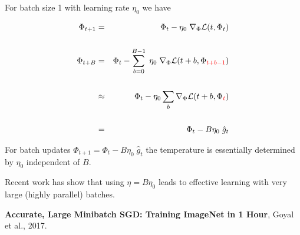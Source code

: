 {

For batch size 1 with learning rate $\eta_0$ we have

\begin{eqnarray*}
\Phi_{t+1} & = &  \Phi_{t} - \eta_0\;\nabla_\Phi {\cal L}(t,\Phi_{t}) \\
\\
\Phi_{t+B} & = &  \Phi_{t} - \sum_{b=0}^{B-1} \;\eta_0\;\nabla_\Phi {\cal L}(t+b,\Phi_{\color{red} t+b-1}) \\
\\
& \approx & \Phi_t - \eta_0 \sum_b \nabla_\Phi {\cal L}(t+b,\Phi_{\color{red} t}) \\
\\
& = & \Phi_t - B\eta_0\; \hat{g}_t
\end{eqnarray*}

\vfill
For batch updates $\Phi_{t+1} = \Phi_t - B\eta_0\; \hat{g}_t$ the temperature is essentially determined by $\eta_0$ independent of $B$.


Recent work has show that using $\eta = B\eta_0$ leads to effective learning with very large (highly parallel)
batches.

\vfill
{\bf Accurate, Large Minibatch SGD: Training ImageNet in 1 Hour}, Goyal et al., 2017.


} 

